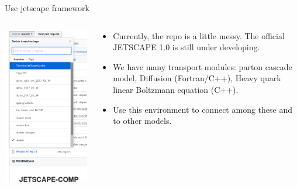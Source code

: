 \documentclass[11pt]{beamer}
\begin{document}
\begin{frame}{Use jetscape framework}
\begin{columns}
\begin{column}{0.3\textwidth}
\includegraphics[width=\textwidth]{branches.png}
\end{column}
\begin{column}{0.7\textwidth}
\begin{itemize}
\item Currently, the repo is a little messy. The official JETSCAPE 1.0 is still under developing. 
\item We have many transport modules: parton cascade model, Diffusion (Fortran/C++), Heavy quark linear Boltzmann equation (C++).
\item Use this environment to connect among these and to other models.
\end{itemize}
\end{column}
\end{columns}


\end{frame}
\end{document}
